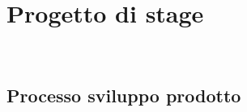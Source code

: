 
\chapter{Progetto di stage}
\label{cap:progetto-di-stage}

\\

\section{Processo sviluppo prodotto}